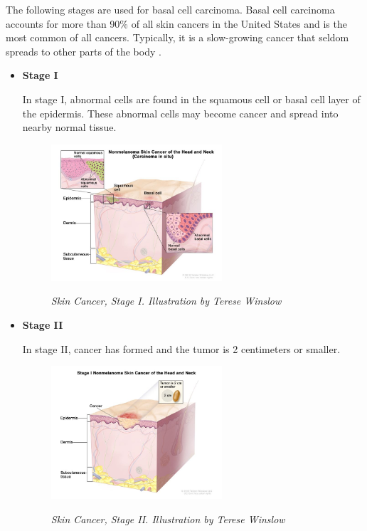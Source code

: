 The following stages are used for basal cell carcinoma. Basal cell carcinoma
accounts for more than 90\% of all skin cancers in the United States and is the
most common of all cancers. Typically, it is a slow-growing cancer that seldom
spreads to other parts of the body \cite{CancerInstitute}. \\

\begin{itemize}

  \item \textbf{Stage I}

    In stage I, abnormal cells are found in the squamous cell or basal cell
    layer of the epidermis. These abnormal cells may become cancer and spread
    into nearby normal tissue.

    \begin{figure}[H] \centering
      \includegraphics[width=0.6\textwidth]{imatges/problem_domain/phase0-skin-cancer.jpg}
      \caption[Skin Cancer, Stage I]{\textit{Skin Cancer, Stage I. Illustration by Terese Winslow}}
    {\label{fig:stage0-skin-canceer}} \end{figure}

    \newpage


  \item \textbf{Stage II}

    In stage II, cancer has formed and the tumor is 2 centimeters or smaller.

    \begin{figure}[H] \centering
      \includegraphics[width=0.6\textwidth]{imatges/problem_domain/stage1-skin-cancer.jpg}
      \caption[Skin Cancer, Stage II]{\textit{Skin Cancer, Stage II.
      Illustration by Terese Winslow}} {\label{fig:stage1-skin-canceer}}
    \end{figure}



\end{itemize}
